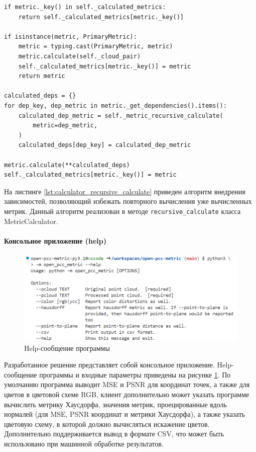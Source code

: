 \documentclass[a4paper,12pt]{extreport}
\begin{document}
\begin{lstlisting}[caption={
    Алгоритм подсчёта метрик.
}, label={lst:calculator_recursive_calculate}]
if metric._key() in self._calculated_metrics:
    return self._calculated_metrics[metric._key()]

if isinstance(metric, PrimaryMetric):
    metric = typing.cast(PrimaryMetric, metric)
    metric.calculate(self._cloud_pair)
    self._calculated_metrics[metric._key()] = metric
    return metric

calculated_deps = {}
for dep_key, dep_metric in metric._get_dependencies().items():
    calculated_dep_metric = self._metric_recursive_calculate(
        metric=dep_metric,
    )
    calculated_deps[dep_key] = calculated_dep_metric

metric.calculate(**calculated_deps)
self._calculated_metrics[metric._key()] = metric
\end{lstlisting}

На листинге \ref{lst:calculator_recursive_calculate} приведен алгоритм внедрения
зависимостей, позволяющий избежать повторного вычисления уже вычисленных метрик.
Данный алгоритм реализован в методе \texttt{recursive\_calculate} класса
MetricCalculator.

\paragraph{Консольное приложение (help)}

\begin{figure}[H]
    \centering
    \includegraphics[width=0.7\linewidth]{assets/open_pcc_metric_help.png}
    \caption{Help-сообщение программы}
    \label{img:pcc_metric_help}
\end{figure}

Разработанное решение представляет собой консольное приложение. Help-сообщение
программы и входные параметры приведены на рисунке \ref{img:pcc_metric_help}. По
умолчанию программа выводит MSE и PSNR для координат точек, а также для цветов в
цветовой схеме RGB, клиент дополнительно может указать программе вычислить
метрику Хаусдорфа, значения метрик, проецированные вдоль нормалей (для MSE, PSNR
координат и метрики Хаусдорфа), а также указать цветовую схему, в которой должно
вычисляться искажение цветов. Дополнительно поддерживается вывод в формате CSV,
что может быть использовано при машинной обработке результатов.
\end{document}
